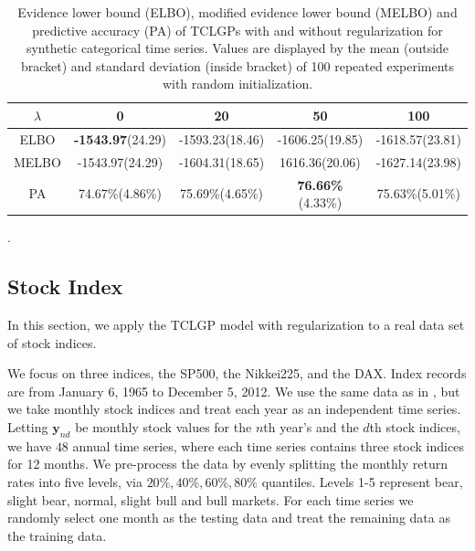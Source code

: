 \documentclass{article}
\begin{document}
\begin{table}[ht!]
	\centering
	\begin{tabular}{|c|c|c|c|c|}
		\hline
		$\lambda$ & 0 & 20 & 50 & 100 \\
		\hline
		ELBO & \textbf{-1543.97}(24.29)  & -1593.23(18.46) & -1606.25(19.85) & -1618.57(23.81) \\
		\hline
		MELBO & -1543.97(24.29) & -1604.31(18.65) & 1616.36(20.06) & -1627.14(23.98) \\
		\hline
		PA & 74.67\%(4.86\%) & 75.69\%(4.65\%) & \textbf{76.66\%}(4.33\%) & 75.63\%(5.01\%)\\
		\hline
	\end{tabular}
	\caption{Evidence lower bound (ELBO), modified evidence lower bound (MELBO) and predictive accuracy (PA) of TCLGPs with and without regularization for synthetic categorical time series. Values are displayed by the mean (outside bracket) and standard deviation (inside bracket) of 100 repeated experiments with random initialization.}
	\label{tab:SIM}
\end{table}.
\subsection{Stock Index}
In this section, we apply the TCLGP model with regularization to a real data set of stock indices.

We focus on three indices, the SP500, the Nikkei225, and the DAX. Index records are from January 6, 1965 to December 5, 2012. We use the same data as in \cite{Joao_2014}, but we take monthly stock indices and treat each year as an independent time series. Letting $\bm y_{nd}$ be monthly stock values for the $n$th year's and the $d$th stock indices, we have $48$ annual time series, where each time series contains three stock indices for 12 months. We pre-process the data by evenly splitting the monthly return rates into five levels, via $20\%, 40\%, 60\%, 80\%$ quantiles.
%
Levels 1-5 represent bear, slight bear, normal, slight bull and bull markets. For each time series we randomly select one month as the testing data and treat the remaining data as the training data.

\end{document}
